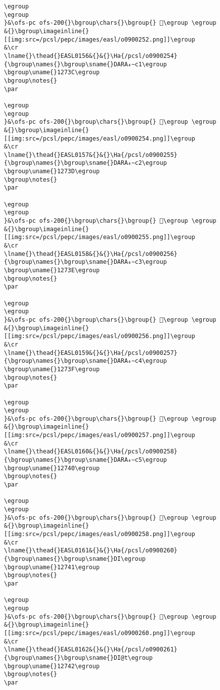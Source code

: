 \begin{verbatim}
\egroup
\egroup
}&\ofs-pc ofs-200{}\bgroup\chars{}\bgroup{} 𒜻\egroup \egroup
&{}\bgroup\imageinline{}[[img:src=/pcsl/pepc/images/easl/o0900252.png]]\egroup
&\cr
\lname{}\thead{}EASL0156&{}&{}\Ha{/pcsl/o0900254}{\bgroup\names{}\bgroup\sname{}DARA₄∼c1\egroup
\bgroup\uname{}1273C\egroup
\bgroup\notes{}
\par 

\egroup
\egroup
}&\ofs-pc ofs-200{}\bgroup\chars{}\bgroup{} 𒜼\egroup \egroup
&{}\bgroup\imageinline{}[[img:src=/pcsl/pepc/images/easl/o0900254.png]]\egroup
&\cr
\lname{}\thead{}EASL0157&{}&{}\Ha{/pcsl/o0900255}{\bgroup\names{}\bgroup\sname{}DARA₄∼c2\egroup
\bgroup\uname{}1273D\egroup
\bgroup\notes{}
\par 

\egroup
\egroup
}&\ofs-pc ofs-200{}\bgroup\chars{}\bgroup{} 𒜽\egroup \egroup
&{}\bgroup\imageinline{}[[img:src=/pcsl/pepc/images/easl/o0900255.png]]\egroup
&\cr
\lname{}\thead{}EASL0158&{}&{}\Ha{/pcsl/o0900256}{\bgroup\names{}\bgroup\sname{}DARA₄∼c3\egroup
\bgroup\uname{}1273E\egroup
\bgroup\notes{}
\par 

\egroup
\egroup
}&\ofs-pc ofs-200{}\bgroup\chars{}\bgroup{} 𒜾\egroup \egroup
&{}\bgroup\imageinline{}[[img:src=/pcsl/pepc/images/easl/o0900256.png]]\egroup
&\cr
\lname{}\thead{}EASL0159&{}&{}\Ha{/pcsl/o0900257}{\bgroup\names{}\bgroup\sname{}DARA₄∼c4\egroup
\bgroup\uname{}1273F\egroup
\bgroup\notes{}
\par 

\egroup
\egroup
}&\ofs-pc ofs-200{}\bgroup\chars{}\bgroup{} 𒜿\egroup \egroup
&{}\bgroup\imageinline{}[[img:src=/pcsl/pepc/images/easl/o0900257.png]]\egroup
&\cr
\lname{}\thead{}EASL0160&{}&{}\Ha{/pcsl/o0900258}{\bgroup\names{}\bgroup\sname{}DARA₄∼c5\egroup
\bgroup\uname{}12740\egroup
\bgroup\notes{}
\par 

\egroup
\egroup
}&\ofs-pc ofs-200{}\bgroup\chars{}\bgroup{} 𒝀\egroup \egroup
&{}\bgroup\imageinline{}[[img:src=/pcsl/pepc/images/easl/o0900258.png]]\egroup
&\cr
\lname{}\thead{}EASL0161&{}&{}\Ha{/pcsl/o0900260}{\bgroup\names{}\bgroup\sname{}DI\egroup
\bgroup\uname{}12741\egroup
\bgroup\notes{}
\par 

\egroup
\egroup
}&\ofs-pc ofs-200{}\bgroup\chars{}\bgroup{} 𒝁\egroup \egroup
&{}\bgroup\imageinline{}[[img:src=/pcsl/pepc/images/easl/o0900260.png]]\egroup
&\cr
\lname{}\thead{}EASL0162&{}&{}\Ha{/pcsl/o0900261}{\bgroup\names{}\bgroup\sname{}DI@t\egroup
\bgroup\uname{}12742\egroup
\bgroup\notes{}
\par 


\end{verbatim}
